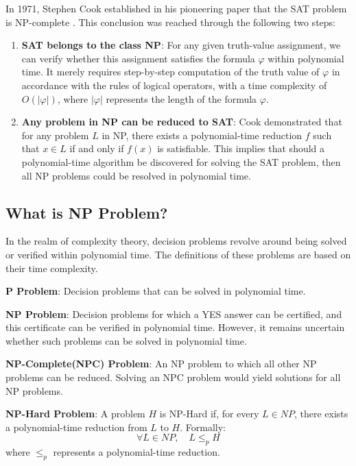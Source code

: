 \documentclass[acmsmall]{acmart}
\begin{document}
	In 1971, Stephen Cook established in his pioneering paper that the SAT problem is NP-complete \cite{cook1971complexity}. This conclusion was reached through the following two steps:
	\begin{enumerate}
		\item \textbf{SAT belongs to the class NP}: For any given truth-value assignment, we can verify whether this assignment satisfies the formula \(\varphi\) within polynomial time. It merely requires step-by-step computation of the truth value of \(\varphi\) in accordance with the rules of logical operators, with a time complexity of \(O(|\varphi|)\), where \(|\varphi|\) represents the length of the formula \(\varphi\).
		\item \textbf{Any problem in NP can be reduced to SAT}: Cook demonstrated that for any problem \(L\) in NP, there exists a polynomial-time reduction \(f\) such that \(x\in L\) if and only if \(f(x)\) is satisfiable. This implies that should a polynomial-time algorithm be discovered for solving the SAT problem, then all NP problems could be resolved in polynomial time.
	\end{enumerate}
	
	\subsection{What is NP Problem?}
	
	In the realm of complexity theory, decision problems revolve around being solved or verified within polynomial time. The definitions of these problems are based on their time complexity\cite{cormen2009introduction}.
	
	\textbf{P Problem}: Decision problems that can be solved in polynomial time.
	
	\textbf{NP Problem}: Decision problems for which a YES answer can be certified, and this certificate can be verified in polynomial time. However, it remains uncertain whether such problems can be solved in polynomial time.
	
	\textbf{NP-Complete(NPC) Problem}: An NP problem to which all other NP problems can be reduced. Solving an NPC problem would yield solutions for all NP problems.
	
	\textbf{NP-Hard Problem}: A problem \(H\) is NP-Hard if, for every \(L \in NP\), there exists a polynomial-time reduction from \(L\) to \(H\). Formally:
	\begin{equation}
	\forall L \in NP, \quad L \leq_p H
	\end{equation}
	where \(\leq_p\) represents a polynomial-time reduction.
	
\end{document}
